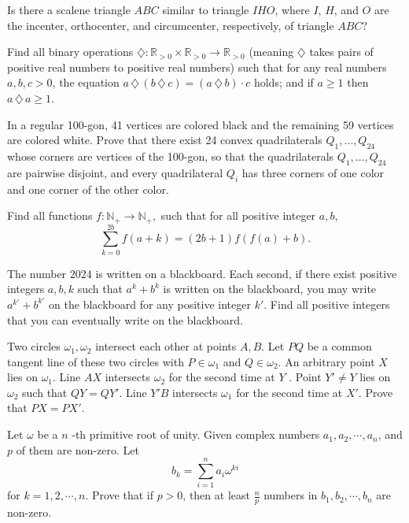 \documentclass[11pt]{scrartcl}
\begin{document}
\begin{problem}[2672133756769464425]
Is there a scalene triangle $ABC$ similar to triangle $IHO$, where $I$, $H$, and $O$ are the incenter, orthocenter, and circumcenter, respectively, of triangle $ABC$?
\end{problem}
\begin{problem}[2694660444585153591]
Find all binary operations $\diamondsuit: \mathbb R_{>0}\times \mathbb R_{>0}\to \mathbb R_{>0}$ (meaning $\diamondsuit$ takes pairs of positive real numbers to positive real numbers) such that for any real numbers $a, b, c > 0$,
the equation $a\,\diamondsuit\, (b\,\diamondsuit \,c) = (a\,\diamondsuit \,b)\cdot c$ holds; and
if $a\ge 1$ then $a\,\diamondsuit\, a\ge 1$.
\end{problem}
\begin{problem}[2749225075653830789]
	In a regular 100-gon, 41 vertices are colored black and the remaining 59 vertices are colored white. Prove that there exist 24 convex quadrilaterals $Q_{1}, \ldots, Q_{24}$ whose corners are vertices of the 100-gon, so that
the quadrilaterals $Q_{1}, \ldots, Q_{24}$ are pairwise disjoint, and
every quadrilateral $Q_{i}$ has three corners of one color and one corner of the other color.
\end{problem}
\begin{problem}[2785451911180838510]
	Find all functions $f:\mathbb N_+\to \mathbb N_+,$ such that for all positive integer $a,b,$
$$\sum_{k=0}^{2b}f(a+k)=(2b+1)f(f(a)+b).$$
\end{problem}
\begin{problem}[2792820689505589235]
	The number $2024$ is written on a blackboard. Each second, if there exist positive integers $a,b,k$ such that $a^k+b^k$ is written on the blackboard, you may write $a^{k'}+b^{k'}$ on the blackboard for any positive integer $k'.$ Find all positive integers that you can eventually write on the blackboard.
\end{problem}
\begin{problem}[2798224660835368817]
Two circles $\omega_1,\omega_2$ intersect each other at points $A,B$. Let $PQ$ be a common tangent line of these two circles with $P \in \omega_1$ and $Q  \in  \omega_2$. An arbitrary point $X$ lies on $\omega_1$. Line $AX$ intersects $ \omega_2$ for the second time at $Y$ . Point $Y'\ne Y$ lies on $\omega_2$ such that $QY = QY'$. Line $Y'B$ intersects $ \omega_1$ for the second time at $X'$. Prove that $PX = PX'$.
\end{problem}
\begin{problem}[2819796018144402111]
Let $\omega$ be a $n$ -th primitive root of unity. Given complex numbers $a_1,a_2,\cdots,a_n$, and $p$ of them are non-zero. Let
$$b_k=\sum_{i=1}^n a_i \omega^{ki}$$for $k=1,2,\cdots, n$. Prove that if $p>0$, then at least $\tfrac{n}{p}$ numbers in $b_1,b_2,\cdots,b_n$ are non-zero.
\end{problem}
\end{document}
